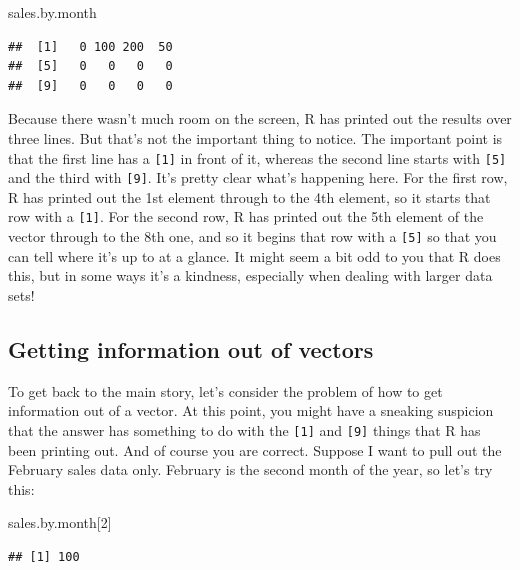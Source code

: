 \documentclass[
]{book}
\newenvironment{Shaded}{\begin{snugshade}}{\end{snugshade}}
\newcommand{\DecValTok}[1]{\textcolor[rgb]{0.00,0.00,0.81}{#1}}
\newcommand{\NormalTok}[1]{#1}
\begin{document}
\begin{Shaded}
\begin{Highlighting}[]
\NormalTok{sales.by.month}
\end{Highlighting}
\end{Shaded}

\begin{verbatim}
##  [1]   0 100 200  50
##  [5]   0   0   0   0
##  [9]   0   0   0   0
\end{verbatim}

Because there wasn't much room on the screen, R has printed out the results over three lines. But that's not the important thing to notice. The important point is that the first line has a \texttt{{[}1{]}} in front of it, whereas the second line starts with \texttt{{[}5{]}} and the third with \texttt{{[}9{]}}. It's pretty clear what's happening here. For the first row, R has printed out the 1st element through to the 4th element, so it starts that row with a \texttt{{[}1{]}}. For the second row, R has printed out the 5th element of the vector through to the 8th one, and so it begins that row with a \texttt{{[}5{]}} so that you can tell where it's up to at a glance. It might seem a bit odd to you that R does this, but in some ways it's a kindness, especially when dealing with larger data sets!

\hypertarget{vectorsubset}{%
\subsection{Getting information out of vectors}\label{vectorsubset}}

To get back to the main story, let's consider the problem of how to get information out of a vector. At this point, you might have a sneaking suspicion that the answer has something to do with the \texttt{{[}1{]}} and \texttt{{[}9{]}} things that R has been printing out. And of course you are correct. Suppose I want to pull out the February sales data only. February is the second month of the year, so let's try this:

\begin{Shaded}
\begin{Highlighting}[]
\NormalTok{sales.by.month[}\DecValTok{2}\NormalTok{]}
\end{Highlighting}
\end{Shaded}

\begin{verbatim}
## [1] 100
\end{verbatim}
\end{document}
